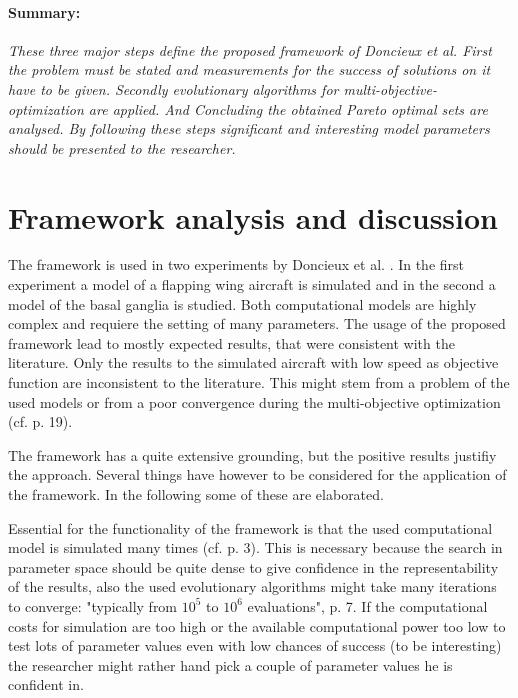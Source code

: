 \documentclass[12pt,twoside]{article}
\theoremstyle{plain}
\theoremstyle{definition}
\theoremstyle{remark}
\begin{document}
\paragraph{Summary:}
\textit{
	These three major steps define the proposed framework of Doncieux et al.
	First the problem must be stated and measurements for the success of solutions on it have to be given. Secondly evolutionary algorithms for multi-objective-optimization are applied. And Concluding the obtained Pareto optimal sets are analysed.
	By following these steps significant and interesting model parameters should be presented to the researcher.
}

\section{Framework analysis and discussion}
\label{sec:analysis}

The framework is used in two experiments by Doncieux et al. \cite{doncieux2015multi}.
In the first experiment a model of a flapping wing aircraft is simulated and in the second a model of the basal ganglia is studied. Both computational models are highly complex and requiere the setting of many parameters. The usage of the proposed framework lead to mostly expected results, that were consistent with the literature. Only the results to the simulated aircraft with low speed as objective function are inconsistent to the literature. This might stem from a problem of the used models or from a poor convergence during the multi-objective optimization (cf. \cite{doncieux2015multi} p. 19).\medskip

The framework has a quite extensive grounding, but the positive results justifiy the approach. Several things have however to be considered for the application of the framework. In the following some of these are elaborated.\medskip

Essential for the functionality of the framework is that the used computational model is simulated many times (cf. \cite{doncieux2015multi} p. 3).
This is necessary because the search in parameter space should be quite dense to give confidence in the representability of the results, also the used evolutionary algorithms might take many iterations to converge: "typically from $10^5$ to $10^6$ evaluations", \cite{doncieux2015multi} p. 7.
If the computational costs for simulation are too high or the available computational power too low to test lots of parameter values even with low chances of success (to be interesting) the researcher might rather hand pick a couple of parameter values he is confident in.\medskip
\end{document}
